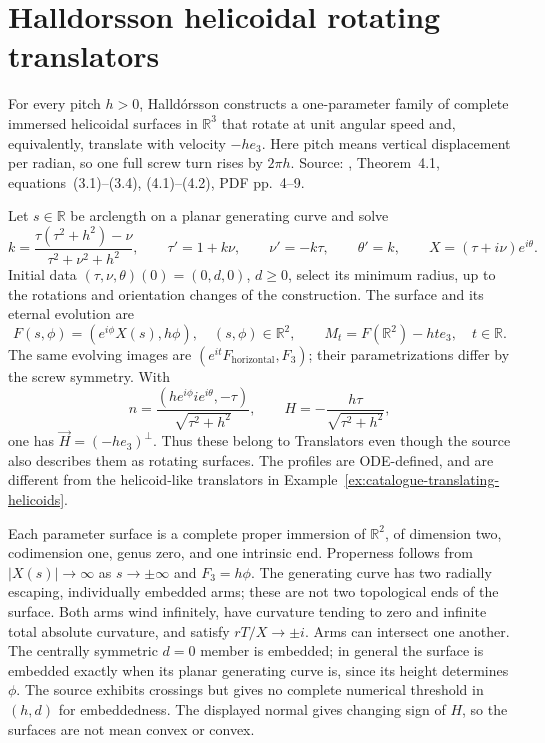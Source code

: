 \chapter{Halldorsson helicoidal rotating translators}\label{sec:catalogue-halldorsson-helicoidal-translators}
\begin{example}\label{ex:catalogue-halldorsson-helicoidal-translators}
For every pitch $h>0$, Halld\'orsson constructs a one-parameter family of
complete immersed helicoidal surfaces in $\mathbb R^3$ that rotate at unit
angular speed and, equivalently, translate with velocity $-he_3$.
Here pitch means vertical displacement per radian, so one full screw turn
rises by $2\pi h$. Source: \cite{CatHalldorsson2013}, Theorem~4.1,
equations~(3.1)--(3.4), (4.1)--(4.2), PDF pp.~4--9.

Let $s\in\mathbb R$ be arclength on a planar generating curve and solve
\[
 k=\frac{\tau(\tau^2+h^2)-\nu}{\tau^2+\nu^2+h^2},\qquad
 \tau'=1+k\nu,\qquad \nu'=-k\tau,\qquad \theta'=k,
 \qquad X=(\tau+i\nu)e^{i\theta}.
\]
Initial data $(\tau,\nu,\theta)(0)=(0,d,0)$, $d\geq0$, select its minimum
radius, up to the rotations and orientation changes of the construction.
The surface and its eternal evolution are
\[
 F(s,\phi)=(e^{i\phi}X(s),h\phi),\quad(s,\phi)\in\mathbb R^2,
 \qquad M_t=F(\mathbb R^2)-ht e_3,\quad t\in\mathbb R.
\]
The same evolving images are $(e^{it}F_{\mathrm{horizontal}},F_3)$;
their parametrizations differ by the screw symmetry. With
\[
 n=\frac{(h e^{i\phi}i e^{i\theta},-\tau)}{\sqrt{\tau^2+h^2}},
 \qquad H=-\frac{h\tau}{\sqrt{\tau^2+h^2}},
\]
one has $\vec H=(-he_3)^\perp$. Thus these belong to Translators even though
the source also describes them as rotating surfaces. The profiles are
ODE-defined, and are different from the helicoid-like translators in
Example~\ref{ex:catalogue-translating-helicoids}.

Each parameter surface is a complete proper immersion of $\mathbb R^2$,
of dimension two, codimension one, genus zero, and one intrinsic end.
Properness follows from $|X(s)|\to\infty$ as $s\to\pm\infty$ and $F_3=h\phi$.
The generating curve has two radially escaping, individually embedded arms;
these are not two topological ends of the surface. Both arms wind infinitely,
have curvature tending to zero and infinite total absolute curvature, and
satisfy $rT/X\to\pm i$. Arms can intersect one another. The centrally
symmetric $d=0$ member is embedded; in general the surface is embedded
exactly when its planar generating curve is, since its height determines
$\phi$. The source exhibits crossings but gives no complete numerical
threshold in $(h,d)$ for embeddedness. The displayed normal gives changing
sign of $H$, so the surfaces are not mean convex or convex.


\end{example}
